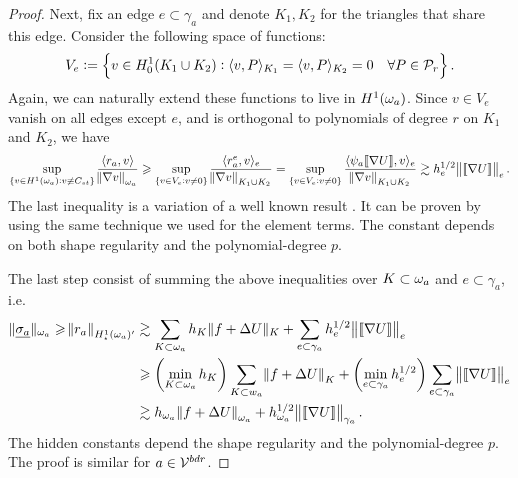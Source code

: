 \documentclass[thesis.tex]{subfiles}
\begin{document}
\begin{proof}
  
  Next, fix an edge $e \subset \gamma_a$ and denote $K_1, K_2$ for the triangles that share this edge. Consider the following space of functions:
  \[
  V_e := \set{v \in H_0^1(K_1 \cup K_2) :  \langle v,P \rangle_{K_1}=  \langle v,P \rangle_{K_2} = 0\quad \forall P \in \mathcal{P}_r}.\]
  Again, we can naturally extend these functions to live in $H^1(\omega_a)$. Since $v \in V_e$ vanish on all edges except $e$, and
  is orthogonal to polynomials of degree $r$ on $K_1$ and $K_2$, we have
  \[
    \sup_{\{v \in H^1(\omega_a) : v \not \equiv C_{st}\}} { \langle r_a, v \rangle \over \norm{\nabla v}_{\omega_a}} 
    \geqslant \sup_{\{v \in V_e: v \ne 0\}} { \langle r^e_a, v \rangle_e \over \norm{\nabla v}_{K_1 \cup K_2}}
    = \sup_{\{v \in V_e: v \ne 0\}} { \langle \psi_a \llbracket \nabla U \rrbracket, v \rangle_e \over \norm{\nabla v}_{K_1 \cup K_2}}
          \gtrsim h_e^{1/2} \norm{\llbracket \nabla U \rrbracket}_e.
  \]
  The last inequality is a variation of a well known result \cite[Ex~9.x.7]{brenner}. It can be proven by using the same
  technique we used for the element terms. The constant depends on both shape regularity and the polynomial-degree $p$.

  The last step consist of summing the above inequalities over $K \subset \omega_a$ and $e \subset \gamma_a$, i.e.
  \begin{align*}
    \| \underline{\sigma_a} \|_{\omega_a} \geqslant \norm{r_a}_{H_\star^1(\omega_a)'} &\gtrsim \sum_{K \subset \omega_a} h_K \|f + \Delta U\|_K + \sum_{e \subset \gamma_a} h_e^{1/2} \norm{\llbracket \nabla U \rrbracket}_e\\
    &\geqslant \left(\min_{K \subset \omega_a} h_K\right) \sum_{K \subset w_a} \norm{f + \Delta U}_K +  \left(\min_{e \subset \gamma_a}h_e^{1/2} \right) \sum_{e \subset \gamma_a} \norm{\llbracket \nabla U \rrbracket}_e\\
    &\gtrsim h_{\omega_a} \norm{ f + \Delta U}_{\omega_a} + h_{\omega_a}^{1/2} \norm{ \llbracket \nabla U \rrbracket}_{\gamma_a}.
  \end{align*}
  The hidden constants depend the shape regularity and the polynomial-degree $p$. The proof is similar for $a \in \mathcal{V}^{bdr}$.
\end{proof}
\end{document}
